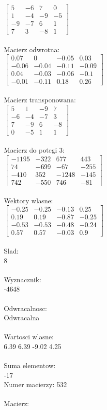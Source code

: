 \documentclass[a4paper,12pt]{article}
\begin{document}
$\begin{bmatrix} 5&-6&7&0\\1&-4&-9&-5\\-9&-7&6&1\\7&3&-8&1 \end{bmatrix}$
\\
\\
Macierz odwrotna:\\

$\begin{bmatrix} 0.07&0&-0.05&0.03\\-0.06&-0.04&-0.11&-0.09\\0.04&-0.03&-0.06&-0.1\\-0.01&-0.11&0.18&0.26 \end{bmatrix}$
\\
\\
Macierz transponowana:\\

$\begin{bmatrix} 5&1&-9&7\\-6&-4&-7&3\\7&-9&6&-8\\0&-5&1&1 \end{bmatrix}$
\\
\\
Macierz do potegi 3:\\

$\begin{bmatrix} -1195&-322&677&443\\74&-699&-67&-255\\-410&352&-1248&-145\\742&-550&746&-81 \end{bmatrix}$
\\
\\
Wektory wlasne:\\

$\begin{bmatrix} -0.25&-0.25&-0.13&0.25\\0.19&0.19&-0.87&-0.25\\-0.53&-0.53&-0.48&-0.24\\0.57&0.57&-0.03&0.9 \end{bmatrix}$
\\
\\
Slad:\\
8
\\
\\
Wyznacznik:\\
-4648
\\
\\
Odwracalnosc:\\
Odwracalna
\\
\\
Wartosci wlasne:\\
6.39 6.39 -9.02 4.25
\\
\\
Suma elementow:\\
-17
\\
\newpage
Numer macierzy:
532
\\
\\
Macierz:\\
\end{document}
